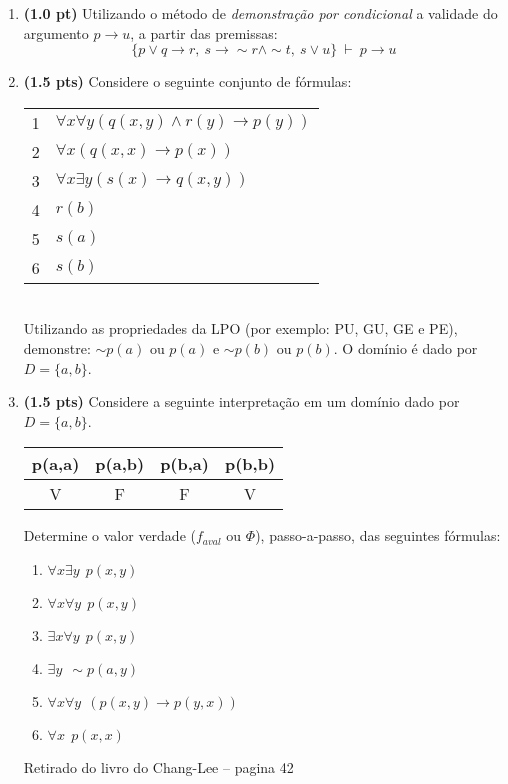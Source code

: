 \documentclass[11pt, a4paper,final]{article}
\begin{document}
\begin{enumerate}
\item {\bf (1.0 pt)} Utilizando o método de  {\em demonstração por condicional}  a validade do   argumento $ p \rightarrow u $, a partir das premissas:
$$ \{ p \vee q \rightarrow r,~ s \rightarrow \sim r \wedge \sim t,~ s \vee u \} ~\vdash~ p \rightarrow u $$




\item {\bf (1.5 pts)} Considere o seguinte conjunto de f\'ormulas: 

\begin{tabular}{ll}
1 &  $\forall x\forall y (q(x,y) \wedge r(y) \rightarrow p(y)) $ \\
2 &  $\forall x  (q(x,x) \rightarrow p(x))  $ \\
3 &  $\forall x \exists y ( s(x) \rightarrow q(x,y)) $ \\
4 &  $r(b)$ \\ 
5 &  $s(a)$ \\
6 &  $s(b)$ \\
\end{tabular}\\
Utilizando as propriedades da LPO (por exemplo: PU, GU, GE e PE), demonstre: $\sim p(a)$ ou $p(a)$ e $\sim p(b)$ ou $p(b)$.
O domínio é dado por $D=\{a,b\}$. 


\item {\bf (1.5 pts)} Considere a seguinte interpretação em um domínio dado por $D=\{a,b\}$. 

\begin{tabular}{c |c | c | c } \hline \hline 
p(a,a) & p(a,b)  & p(b,a) & p(b,b)  \\  \hline 
 V & F & F & V \\ \hline \hline 
\end{tabular}

Determine o valor verdade ($f_{aval}$  ou $\Phi $), passo-a-passo, das seguintes fórmulas:

\begin{enumerate}
\itemsep -2pt
\item $\forall x \exists y \:\: p(x,y) $
\item $\forall x \forall y \:\: p(x,y) $
\item $\exists x \forall y \:\: p(x,y) $
\item $\exists y \:\: \sim p(a,y) $
\item $\forall x \forall y \:\: (p(x,y) \rightarrow p(y,x)) $
\item $\forall x  \:\: p(x,x) $
\end{enumerate}
Retirado do livro do Chang-Lee -- pagina 42



\end{enumerate}
\end{document}
